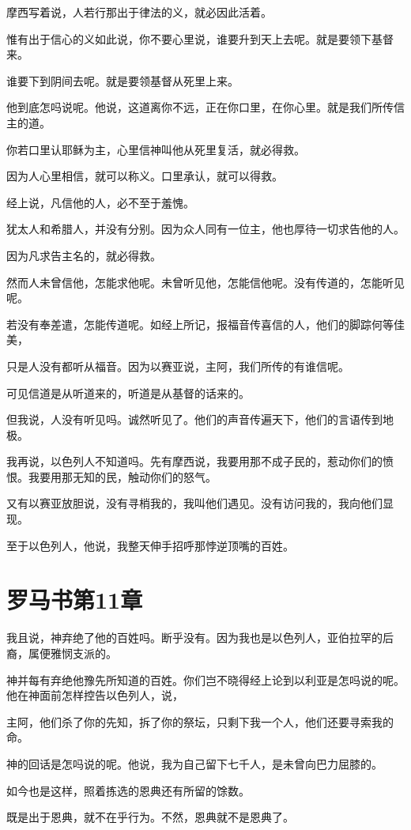 \documentclass[12pt,oneside]{book}
\begin{document}
摩西写着说，人若行那出于律法的义，就必因此活着。

惟有出于信心的义如此说，你不要心里说，谁要升到天上去呢。就是要领下基督来。

谁要下到阴间去呢。就是要领基督从死里上来。

他到底怎吗说呢。他说，这道离你不远，正在你口里，在你心里。就是我们所传信主的道。

你若口里认耶稣为主，心里信神叫他从死里复活，就必得救。

因为人心里相信，就可以称义。口里承认，就可以得救。

经上说，凡信他的人，必不至于羞愧。

犹太人和希腊人，并没有分别。因为众人同有一位主，他也厚待一切求告他的人。

因为凡求告主名的，就必得救。

然而人未曾信他，怎能求他呢。未曾听见他，怎能信他呢。没有传道的，怎能听见呢。

若没有奉差遣，怎能传道呢。如经上所记，报福音传喜信的人，他们的脚踪何等佳美，

只是人没有都听从福音。因为以赛亚说，主阿，我们所传的有谁信呢。

可见信道是从听道来的，听道是从基督的话来的。

但我说，人没有听见吗。诚然听见了。他们的声音传遍天下，他们的言语传到地极。

我再说，以色列人不知道吗。先有摩西说，我要用那不成子民的，惹动你们的愤恨。我要用那无知的民，触动你们的怒气。

又有以赛亚放胆说，没有寻梢我的，我叫他们遇见。没有访问我的，我向他们显现。

至于以色列人，他说，我整天伸手招呼那悖逆顶嘴的百姓。

\chapter{罗马书第11章}
我且说，神弃绝了他的百姓吗。断乎没有。因为我也是以色列人，亚伯拉罕的后裔，属便雅悯支派的。

神并每有弃绝他豫先所知道的百姓。你们岂不晓得经上论到以利亚是怎吗说的呢。他在神面前怎样控告以色列人，说，

主阿，他们杀了你的先知，拆了你的祭坛，只剩下我一个人，他们还要寻索我的命。

神的回话是怎吗说的呢。他说，我为自己留下七千人，是未曾向巴力屈膝的。

如今也是这样，照着拣选的恩典还有所留的馀数。

既是出于恩典，就不在乎行为。不然，恩典就不是恩典了。
\end{document}
